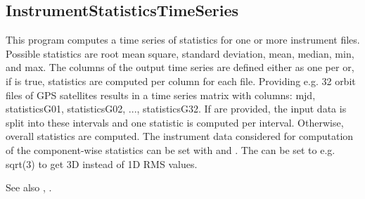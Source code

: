 \clearpage
\subsection{InstrumentStatisticsTimeSeries}\label{InstrumentStatisticsTimeSeries}
This program computes a time series of statistics for one or more instrument files.
Possible statistics are root mean square, standard deviation, mean, median, min, and max.
The columns of the output time series are defined either as one per 
or, if  is true, statistics are computed per column for each file.
Providing e.g. 32 orbit files of GPS satellites results in a time series matrix
with columns: mjd, statisticsG01, statisticsG02, ..., statisticsG32.
If  are provided, the input data is split into these intervals
and one statistic is computed per interval. Otherwise, overall statistics are computed.
The instrument data considered for computation of the component-wise statistics
can be set with  and .
The  can be set to e.g. sqrt(3) to get 3D instead of 1D RMS values.

See also , .


